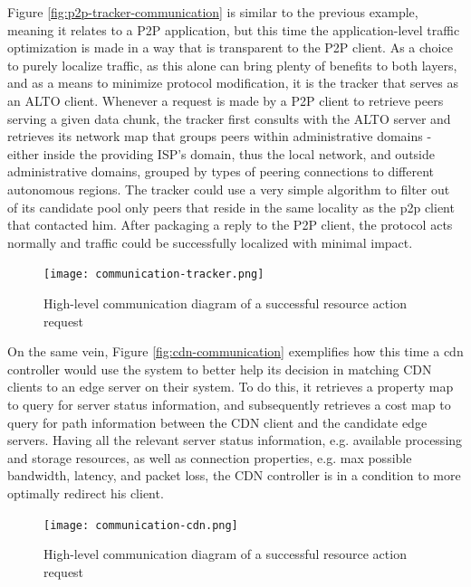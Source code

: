     Figure \ref{fig:p2p-tracker-communication} is similar to the previous example, meaning it relates to a P2P application, but this time the application-level traffic optimization is made in a way that is transparent to the P2P client.
    As a choice to purely localize traffic, as this alone can bring plenty of benefits to both layers, and as a means to minimize protocol modification, it is the tracker that serves as an ALTO client.
    Whenever a request is made by a P2P client to retrieve peers serving a given data chunk, the tracker first consults with the ALTO server and retrieves its network map that groups peers within administrative domains - either inside the providing ISP's domain, thus the local network, and outside administrative domains, grouped by types of peering connections to different autonomous regions.
    The tracker could use a very simple algorithm to filter out of its candidate pool only peers that reside in the same locality as the p2p client that contacted him.
    After packaging a reply to the P2P client, the protocol acts normally and traffic could be successfully localized with minimal impact.

\begin{figure}[h]
        \centering
        \texttt{[image: communication-tracker.png]}
        \caption{High-level communication diagram of a successful resource action request}
        \label{fig:communication-tracker}
\end{figure}

    On the same vein, Figure \ref{fig:cdn-communication} exemplifies how this time a cdn controller would use the system to better help its decision in matching CDN clients to an edge server on their system.
    To do this, it retrieves a property map to query for server status information, and subsequently retrieves a cost map to query for path information between the CDN client and the candidate edge servers.
    Having all the relevant server status information, e.g. available processing and storage resources, as well as connection properties, e.g. max possible bandwidth, latency, and packet loss, the CDN controller is in a condition to more optimally redirect his client.

\begin{figure}[h]
        \centering
        \texttt{[image: communication-cdn.png]}
        \caption{High-level communication diagram of a successful resource action request}
        \label{fig:communication-\gls{cdn}}
\end{figure}

